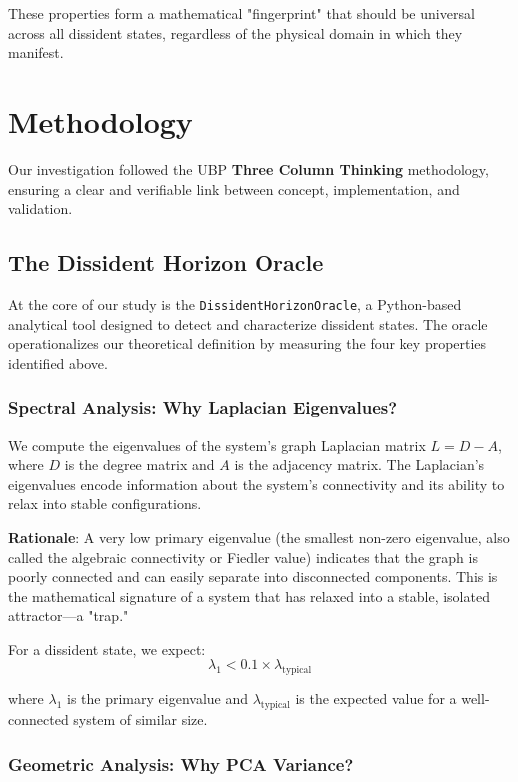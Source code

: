 \documentclass[12pt, a4paper]{article}
\begin{document}
These properties form a mathematical "fingerprint" that should be universal across all dissident states, regardless of the physical domain in which they manifest.

\section{Methodology}

Our investigation followed the UBP \textbf{Three Column Thinking} methodology, ensuring a clear and verifiable link between concept, implementation, and validation.

\subsection{The Dissident Horizon Oracle}

At the core of our study is the \texttt{DissidentHorizonOracle}, a Python-based analytical tool designed to detect and characterize dissident states. The oracle operationalizes our theoretical definition by measuring the four key properties identified above.

\subsubsection{Spectral Analysis: Why Laplacian Eigenvalues?}

We compute the eigenvalues of the system's graph Laplacian matrix $L = D - A$, where $D$ is the degree matrix and $A$ is the adjacency matrix. The Laplacian's eigenvalues encode information about the system's connectivity and its ability to relax into stable configurations.

\textbf{Rationale}: A very low primary eigenvalue (the smallest non-zero eigenvalue, also called the algebraic connectivity or Fiedler value) indicates that the graph is poorly connected and can easily separate into disconnected components. This is the mathematical signature of a system that has relaxed into a stable, isolated attractor—a "trap."

For a dissident state, we expect:
\begin{equation}
\lambda_1 < 0.1 \times \lambda_{\text{typical}}
\end{equation}

where $\lambda_1$ is the primary eigenvalue and $\lambda_{\text{typical}}$ is the expected value for a well-connected system of similar size.

\subsubsection{Geometric Analysis: Why PCA Variance?}
\end{document}
